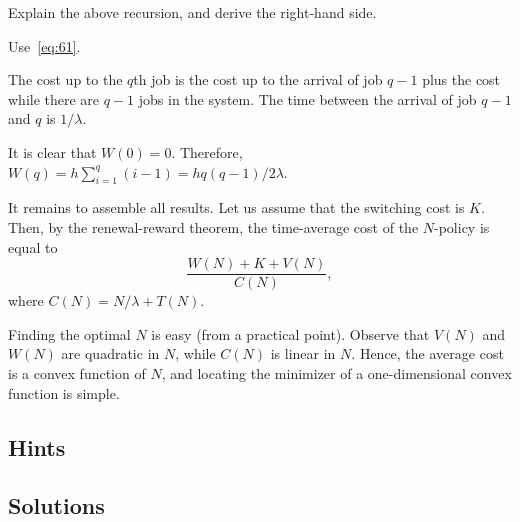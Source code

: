 \documentclass[companion]{subfiles}
\begin{document}
\begin{exercise}
Explain the above recursion, and derive the right-hand side.
\begin{hint}
  Use~\cref{eq:61}.
\end{hint}
\begin{solution}
  The cost up to the $q$th job is the cost up to the arrival of job $q-1$ plus the cost while there are $q-1$ jobs in the system.
  The time between the arrival of job $q-1$ and $q$ is $1/\lambda$.

  It is clear that $W(0)=0$. Therefore, $W(q) = h\sum_{i=1}^q (i-1) = hq(q-1)/2\lambda$. 
\end{solution}
\end{exercise}

It remains to assemble all results. Let us assume that the switching cost is $K$. Then, by the renewal-reward theorem, the time-average cost of the $N$-policy is equal to
\begin{equation*}
  \frac{W(N)+K+V(N)}{C(N)},
\end{equation*}
where $C(N) = N/\lambda + T(N)$.

Finding the optimal $N$ is easy (from a practical point).
Observe that $V(N)$ and $W(N)$ are quadratic in $N$, while $C(N)$ is linear in $N$.
Hence, the average cost is a convex function of $N$, and locating the minimizer of a one-dimensional convex function is simple.


{
\subsection*{Hints}

\subsection*{Solutions}

}
\end{document}

